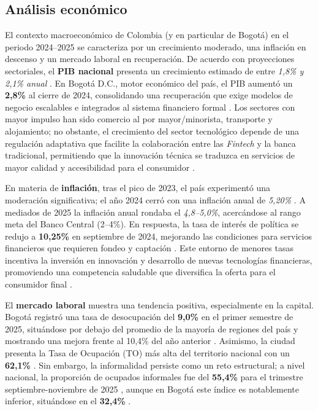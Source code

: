 {}
\subsection*{Análisis económico}

El contexto macroeconómico de Colombia (y en particular de Bogotá) en el periodo 2024–2025 se caracteriza por un crecimiento moderado, una inflación en descenso y un mercado laboral en recuperación. De acuerdo con proyecciones sectoriales, el \textbf{PIB nacional} presenta un crecimiento estimado de entre \textit{1,8\% y 2,1\% anual} \parencite[p. 3]{Asobancaria01}. En Bogotá D.C., motor económico del país, el PIB aumentó un \textbf{2,8\%} al cierre de 2024, consolidando una recuperación que exige modelos de negocio escalables e integrados al sistema financiero formal \parencite[p. 12]{RevistaCIES01}. Los sectores con mayor impulso han sido comercio al por mayor/minorista, transporte y alojamiento; no obstante, el crecimiento del sector tecnológico depende de una regulación adaptativa que facilite la colaboración entre las \textit{Fintech} y la banca tradicional, permitiendo que la innovación técnica se traduzca en servicios de mayor calidad y accesibilidad para el consumidor \parencite[p. 15]{RevistaCIES01}.

En materia de \textbf{inflación}, tras el pico de 2023, el país experimentó una moderación significativa; el año 2024 cerró con una inflación anual de \textit{5,20\%} \parencite[p. 5]{Asobancaria01}. A mediados de 2025 la inflación anual rondaba el \textit{4,8–5,0\%}, acercándose al rango meta del Banco Central (2–4\%). En respuesta, la tasa de interés de política se redujo a \textbf{10,25\%} en septiembre de 2024, mejorando las condiciones para servicios financieros que requieren fondeo y captación \parencite[p. 2]{Asobancaria01}. Este entorno de menores tasas incentiva la inversión en innovación y desarrollo de nuevas tecnologías financieras, promoviendo una competencia saludable que diversifica la oferta para el consumidor final \parencite[p. 17]{RevistaCIES01}.

El \textbf{mercado laboral} muestra una tendencia positiva, especialmente en la capital. Bogotá registró una tasa de desocupación del \textbf{9,0\%} en el primer semestre de 2025, situándose por debajo del promedio de la mayoría de regiones del país y mostrando una mejora frente al 10,4\% del año anterior \parencite[p. 1, 3]{DANE_Regiones}. Asimismo, la ciudad presenta la Tasa de Ocupación (TO) más alta del territorio nacional con un \textbf{62,1\%} \parencite[p. 4]{DANE_Regiones}. Sin embargo, la informalidad persiste como un reto estructural; a nivel nacional, la proporción de ocupados informales fue del \textbf{55,4\%} para el trimestre septiembre-noviembre de 2025 \parencite[p. 4]{DANE01}, aunque en Bogotá este índice es notablemente inferior, situándose en el \textbf{32,4\%} \parencite[p. 11]{DANE01}.

